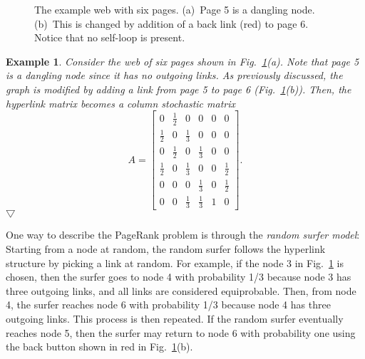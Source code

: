 \documentclass[11pt,draftcls,onecolumn]{IEEEtran}
\newtheorem{example}[theorem]{Example}
\newcommand{\End}{\hfill \mbox{$\bigtriangledown$}}
\begin{document}
\begin{figure}[t]
  \centering
  \caption{The example web with six pages. (a)~Page 5 is a dangling node. 
           (b)~This is changed by addition of a back link (red) to page 6. 
            Notice that no self-loop is present.
}
\label{fig:graph}
\end{figure}

\begin{example}\label{ex:1}\rm
Consider the web of six pages shown in Fig.~\ref{fig:graph}\;(a). 
Note that page 5 is a dangling node since it has no outgoing links.
As previously discussed, the graph is modified by adding a link from page 5 to
page 6 (Fig.~\ref{fig:graph}\;(b)). Then, the hyperlink matrix becomes a column stochastic matrix
\begin{equation*}
 A = \begin{bmatrix}
       0           & \frac{1}{2} & 0           & 0           & 0 & 0\\
       \frac{1}{2} & 0           & \frac{1}{3} & 0           & 0 & 0\\
       0           & \frac{1}{2} & 0           & \frac{1}{3} & 0 & 0\\
       \frac{1}{2} & 0           & \frac{1}{3} & 0           & 0 & \frac{1}{2}\\
       0           & 0           & 0           & \frac{1}{3} & 0 & \frac{1}{2}\\
       0           & 0           & \frac{1}{3} & \frac{1}{3} & 1 & 0
     \end{bmatrix}.
\end{equation*}
\End
\end{example}

\vspace{.5cm}

One way to describe the PageRank problem is through 
the {\it random surfer model}: Starting from a node at random, 
the random surfer follows the hyperlink structure by picking a link at random. For example, 
if the node 3 in Fig.~\ref{fig:graph} is chosen, then the surfer goes to node 4 with probability 1/3 because 
node 3 has three outgoing links, and all links are considered equiprobable. Then,
from node 4, the surfer reaches node 6 with probability 1/3 because node 4 has three outgoing links. 
This process is then repeated. If the random surfer eventually reaches node 5, then the surfer may 
return to node 6  with probability one using the back button shown in red in 
Fig.~\ref{fig:graph}\;(b).
\end{document}
